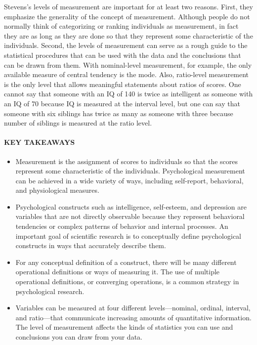 \documentclass[
]{krantz}
\providecommand{\tightlist}{%
  \setlength{\itemsep}{0pt}\setlength{\parskip}{0pt}}
\begin{document}
Stevens's levels of measurement are important for at least two reasons. First, they emphasize the generality of the concept of measurement. Although people do not normally think of categorizing or ranking individuals as measurement, in fact they are as long as they are done so that they represent some characteristic of the individuals. Second, the levels of measurement can serve as a rough guide to the statistical procedures that can be used with the data and the conclusions that can be drawn from them. With nominal-level measurement, for example, the only available measure of central tendency is the mode. Also, ratio-level measurement is the only level that allows meaningful statements about ratios of scores. One cannot say that someone with an IQ of 140 is twice as intelligent as someone with an IQ of 70 because IQ is measured at the interval level, but one can say that someone with six siblings has twice as many as someone with three because number of siblings is measured at the ratio level.

\hypertarget{key-takeaways-14}{%
\paragraph*{KEY TAKEAWAYS}\label{key-takeaways-14}}

\begin{itemize}
\tightlist
\item
  Measurement is the assignment of scores to individuals so that the scores represent some characteristic of the individuals. Psychological measurement can be achieved in a wide variety of ways, including self-report, behavioral, and physiological measures.
\item
  Psychological constructs such as intelligence, self-esteem, and depression are variables that are not directly observable because they represent behavioral tendencies or complex patterns of behavior and internal processes. An important goal of scientific research is to conceptually define psychological constructs in ways that accurately describe them.
\item
  For any conceptual definition of a construct, there will be many different operational definitions or ways of measuring it. The use of multiple operational definitions, or converging operations, is a common strategy in psychological research.
\item
  Variables can be measured at four different levels---nominal, ordinal, interval, and ratio---that communicate increasing amounts of quantitative information. The level of measurement affects the kinds of statistics you can use and conclusions you can draw from your data.
\end{itemize}
\end{document}
